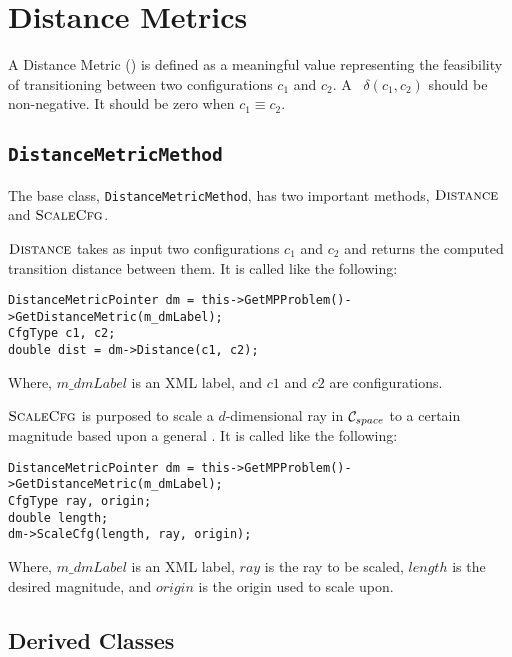 \chapter{Distance Metrics}

A Distance Metric (\dm) is defined as a meaningful value representing the
feasibility of transitioning between two configurations $c_1$ and $c_2$. A \dm\
$\delta(c_1, c_2)$ should be non-negative. It should be zero when $c_1 \equiv
c_2$.

\section{\texttt{DistanceMetricMethod}}

The base class, \texttt{DistanceMetricMethod}, has two important methods,
$\textsc{Distance}$ and $\textsc{ScaleCfg}$.

$\textsc{Distance}$ takes as input two configurations $c_1$ and $c_2$ and returns
the computed transition distance between them. It is called like the following:
\begin{lstlisting}
DistanceMetricPointer dm = this->GetMPProblem()->GetDistanceMetric(m_dmLabel);
CfgType c1, c2;
double dist = dm->Distance(c1, c2);
\end{lstlisting}
Where, $m\_dmLabel$ is an XML label, and $c1$ and $c2$ are configurations.

$\textsc{ScaleCfg}$ is purposed to scale a $d$-dimensional ray in $\mathcal{C}_{space}$ to a
certain magnitude based upon a general \dm. It is called like the following:
\begin{lstlisting}
DistanceMetricPointer dm = this->GetMPProblem()->GetDistanceMetric(m_dmLabel);
CfgType ray, origin;
double length;
dm->ScaleCfg(length, ray, origin);
\end{lstlisting}
Where, $m\_dmLabel$ is an XML label, $ray$ is the ray to be scaled, $length$ is
the desired magnitude, and $origin$ is the origin used to scale upon.

\section{Derived Classes}

